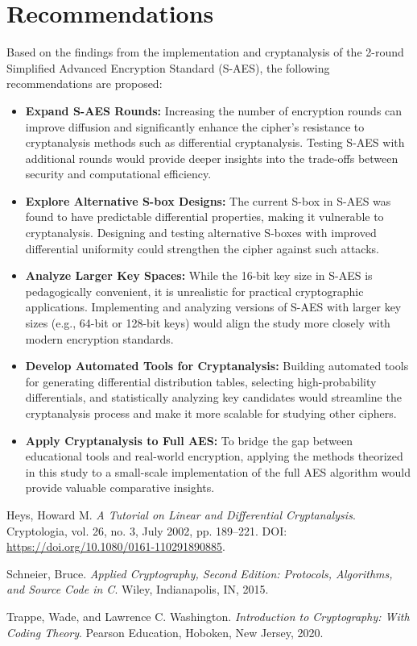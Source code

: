 \documentclass{article}
\begin{document}
\section{Recommendations}
Based on the findings from the implementation and cryptanalysis of the 2-round Simplified Advanced Encryption Standard (S-AES), the following recommendations are proposed:
\begin{itemize}
    \item \textbf{Expand S-AES Rounds:} Increasing the number of encryption rounds can improve diffusion and significantly enhance the cipher's resistance to cryptanalysis methods such as differential cryptanalysis. Testing S-AES with additional rounds would provide deeper insights into the trade-offs between security and computational efficiency.

    \item \textbf{Explore Alternative S-box Designs:} The current S-box in S-AES was found to have predictable differential properties, making it vulnerable to cryptanalysis. Designing and testing alternative S-boxes with improved differential uniformity could strengthen the cipher against such attacks.

    \item \textbf{Analyze Larger Key Spaces:} While the 16-bit key size in S-AES is pedagogically convenient, it is unrealistic for practical cryptographic applications. Implementing and analyzing versions of S-AES with larger key sizes (e.g., 64-bit or 128-bit keys) would align the study more closely with modern encryption standards.


    \item \textbf{Develop Automated Tools for Cryptanalysis:} Building automated tools for generating differential distribution tables, selecting high-probability differentials, and statistically analyzing key candidates would streamline the cryptanalysis process and make it more scalable for studying other ciphers.

    \item \textbf{Apply Cryptanalysis to Full AES:} To bridge the gap between educational tools and real-world encryption, applying the methods theorized in this study to a small-scale implementation of the full AES algorithm would provide valuable comparative insights.
\end{itemize}
\newpage


\begin{thebibliography}{99}

Heys, Howard M. 
\emph{A Tutorial on Linear and Differential Cryptanalysis}. 
Cryptologia, vol. 26, no. 3, July 2002, pp. 189–221. 
DOI: \url{https://doi.org/10.1080/0161-110291890885}.

Schneier, Bruce. 
\emph{Applied Cryptography, Second Edition: Protocols, Algorithms, and Source Code in C}. 
Wiley, Indianapolis, IN, 2015.

Trappe, Wade, and Lawrence C. Washington. 
\emph{Introduction to Cryptography: With Coding Theory}. 
Pearson Education, Hoboken, New Jersey, 2020.

\end{thebibliography}
\end{document}
